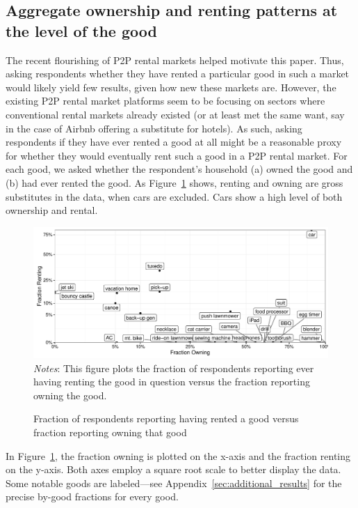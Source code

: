 \documentclass[12pt]{article}
\begin{document}
\subsection{Aggregate ownership and renting patterns at the level of the good}
The recent flourishing of P2P rental markets helped motivate this paper. 
Thus, asking respondents whether they have rented a particular good in such a market would likely yield few results, given how new these markets are.
However, the existing P2P rental market platforms seem to be focusing on sectors where conventional rental markets already existed (or at least met the same want, say in the case of Airbnb offering a substitute for hotels).
As such, asking respondents if they have ever rented a good at all might be a reasonable proxy for whether they would eventually rent such a good in a P2P rental market. 
For each good, we asked whether the respondent's household (a) owned the good and (b) had ever rented the good.
As Figure~\ref{fig:scatter} shows, renting and owning are gross substitutes in the data, when cars are excluded.
Cars show a high level of both ownership and rental. 

\begin{figure}
\centering 
\caption{Fraction of respondents reporting having rented a good versus fraction reporting owning that good\label{fig:scatter} }
\begin{minipage}{0.90 \linewidth}
  \includegraphics[width = \linewidth]{./plots/scatter_rent_v_own.pdf} \\
    {\footnotesize
    \emph{Notes}: This figure plots the fraction of respondents reporting ever having renting the good in question versus the fraction reporting owning the good. 
    }
\end{minipage}
\end{figure} 

In Figure~\ref{fig:scatter}, the fraction owning is plotted on the x-axis and the fraction renting on the y-axis.
Both axes employ a square root scale to better display the data. 
Some notable goods are labeled---see Appendix~\ref{sec:additional_results} for the precise by-good fractions for every good.
\end{document}
